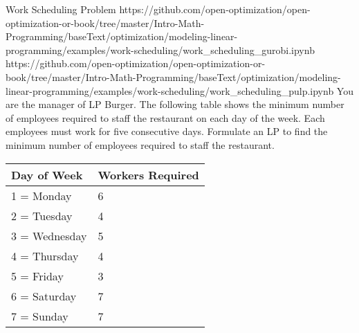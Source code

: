\begin{examplewithallcode}{Work Scheduling Problem}
    {}
    {https://github.com/open-optimization/open-optimization-or-book/tree/master/Intro-Math-Programming/baseText/optimization/modeling-linear-programming/examples/work-scheduling/work_scheduling_gurobi.ipynb}
    {https://github.com/open-optimization/open-optimization-or-book/tree/master/Intro-Math-Programming/baseText/optimization/modeling-linear-programming/examples/work-scheduling/work_scheduling_pulp.ipynb}
    You are the manager of LP Burger. The following table shows the minimum number of employees required to staff the restaurant on each day of the week. Each employees must work for five consecutive days. Formulate an LP to find the minimum number of employees required to staff the restaurant.
    
    \end{examplewithallcode}
    
    \begin{table}[h!] \begin{center} \begin{tabular} {|l|l|} 
    \hline Day of Week & Workers Required   \\ \hline
    \hline  1 = Monday & 6  \\
    \hline  2 = Tuesday & 4  \\
    \hline  3 = Wednesday & 5  \\
    \hline  4 = Thursday & 4  \\
    \hline  5 = Friday & 3  \\
    \hline  6 = Saturday & 7  \\
    \hline  7 = Sunday & 7  \\
    \hline \end{tabular} \end{center} \end{table}
    
